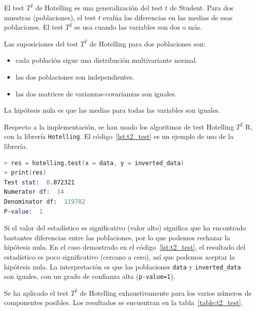 \documentclass[11pt,spanish,listoffigures,listoftables]{tfgetsinf}
\begin{document}
    El test \(T^2\) de Hotelling es una generalización del test \(t\) de Student. Para dos muestras (poblaciones), el test \(t\) evalúa las diferencias en las medias de esas poblaciones. El test \(T^2\) se usa cuando las variables son dos o más.

    Las suposiciones del test \(T^2\) de Hotelling para dos poblaciones son:
    \begin{itemize}
    \item cada población sigue una distribución multivariante normal.
    \item las dos poblaciones son independientes.
    \item las dos matrices de varianzas-covarianzas son iguales.
    \end{itemize}
    
    La hipótesis nula es que las medias para todas las variables son iguales. 
    
    Respecto a la implementación, se han usado los algoritmos de test Hotelling \(T^2\) R, con la librería {\tt Hotelling}. El código~\ref{lst:t2_test} es un ejemplo de uso de la librería.

    \begin{lstlisting}[language=S, caption=Test \(T^2\) de Hotelling en R., label={lst:t2_test}]
> res = hotelling.test(x = data, y = inverted_data)
> print(res)
Test stat:  0.072321 
Numerator df:  14 
Denominator df:  119782 
P-value:  1
    \end{lstlisting}
    
    Si el valor del estadístico es significativo (valor alto) significa que ha encontrado bastantes diferencias entre las poblaciones, por lo que podemos rechazar la hipótesis nula. En el caso demostrado en el código~\ref{lst:t2_test}, el resultado del estadístico es poco significativo (cercano a cero), así que podemos aceptar la hipótesis nula. La interpretación es que las poblaciones {\tt data} y {\tt inverted\_data} son iguales, con un grado de confianza alta ({\tt p-value=1}). 
    
    Se ha aplicado el test \(T^2\) de Hotelling exhaustivamente para los varios números de componentes posibles. Los resultados se encuentran en la tabla~\ref{table:t2_test}.
    
\end{document}
